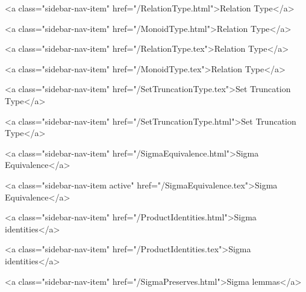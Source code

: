       
    
      
        
          <a class="sidebar-nav-item" href="/RelationType.html">Relation Type</a>
        
      
    
      
        
          <a class="sidebar-nav-item" href="/MonoidType.html">Relation Type</a>
        
      
    
      
        
          <a class="sidebar-nav-item" href="/RelationType.tex">Relation Type</a>
        
      
    
      
        
          <a class="sidebar-nav-item" href="/MonoidType.tex">Relation Type</a>
        
      
    
      
        
          <a class="sidebar-nav-item" href="/SetTruncationType.tex">Set Truncation Type</a>
        
      
    
      
        
          <a class="sidebar-nav-item" href="/SetTruncationType.html">Set Truncation Type</a>
        
      
    
      
        
          <a class="sidebar-nav-item" href="/SigmaEquivalence.html">Sigma Equivalence</a>
        
      
    
      
        
          <a class="sidebar-nav-item active" href="/SigmaEquivalence.tex">Sigma Equivalence</a>
        
      
    
      
        
          <a class="sidebar-nav-item" href="/ProductIdentities.html">Sigma identities</a>
        
      
    
      
        
          <a class="sidebar-nav-item" href="/ProductIdentities.tex">Sigma identities</a>
        
      
    
      
        
          <a class="sidebar-nav-item" href="/SigmaPreserves.html">Sigma lemmas</a>
        
